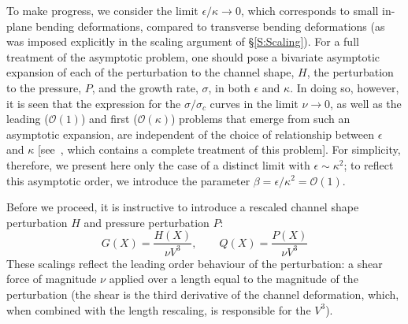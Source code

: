 \documentclass{jfm}
\newcommand{\order}[1]{\mathcal{O}\left(#1\right)}
\begin{document}
To make progress, we consider the limit $\epsilon / \kappa \to 0$, which corresponds to small in-plane bending deformations, compared to transverse bending deformations (as was imposed explicitly in the scaling argument of \S\ref{S:Scaling}). For a full treatment of the asymptotic problem, one should pose a bivariate asymptotic expansion of each of the perturbation to the channel shape, $H$, the perturbation to the pressure,
$P$, and the growth rate, $\sigma$, in both $\epsilon$ and $\kappa$. In doing so, however, it is seen that the expression for the $\sigma/\sigma_c$ curves in the limit $\nu \to 0$, as well as the leading ($\order{1}$) and first ($\order{\kappa}$) problems that emerge from such an asymptotic expansion, are independent of the choice of relationship between $\epsilon$ and $\kappa$ [see~\citet{BradleyPhDthesis}, which contains a complete treatment of this problem]. For simplicity, therefore, we present here only the case of a distinct limit with $\epsilon \sim \kappa^2$; to reflect this asymptotic order, we introduce the parameter $\beta = \epsilon/\kappa^2 = \order{1}$.

Before we proceed, it is instructive to introduce a rescaled channel shape perturbation $H$ and pressure perturbation $P$:
\begin{equation}\label{E:Asymptotics:Rescaling}
G(X) = \frac{H(X)}{\nu V^3}, \qquad Q(X) = \frac{P(X)}{\nu V^3}
\end{equation}
These scalings reflect the leading order behaviour of the perturbation: a shear force of magnitude $\nu$ applied over a length equal to  the magnitude  of  the  perturbation  (the  shear  is  the  third  derivative  of  the  channel deformation, which, when combined with the length rescaling, is responsible for the $V^3$). 
\end{document}
